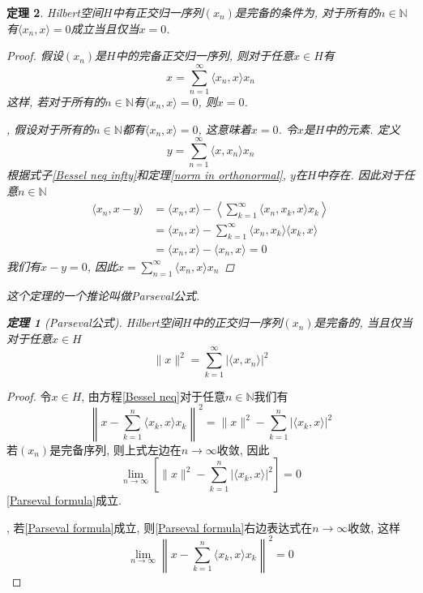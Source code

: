 \documentclass[a4paper,11pt]{article}
\newtheorem{theorem}{\hspace{2em}定理}[section]
\newtheorem{proof}{证明}[section]
\begin{document}
\begin{theorem}
  Hilbert空间$H$中有正交归一序列$(x_n)$是完备的条件为, 对于所有的$n\in\mathbb{N}$有$\langle x_n,x\rangle=0$成立当且仅当$x=0$.
  \begin{proof}
    假设$(x_n)$是$H$中的完备正交归一序列, 则对于任意$x\in H$有
    \begin{equation*}
      x=\sum_{n=1}^{\infty}\langle x_n,x\rangle x_n
    \end{equation*}
    这样, 若对于所有的$n\in \mathbb{N}$有$\langle x_n,x\rangle=0$, 则$x=0$.

    , 假设对于所有的$n\in \mathbb{N}$都有$\langle x_n,x\rangle=0$, 这意味着$x=0$. 令$x$是$H$中的元素. 定义
    \begin{equation*}
      y=\sum_{n=1}^{\infty}\langle x,x_n\rangle x_n
    \end{equation*}
    根据式子\eqref{Bessel neq infty}和定理\ref{norm in orthonormal}, $y$在$H$中存在. 因此对于任意$n\in \mathbb{N}$
    \begin{equation*}
      \begin{split}
         \langle x_n,x-y\rangle & =\langle x_n,x\rangle-\left\langle\sum_{k=1}^{\infty}\langle x_n,x_k,x\rangle x_k\right\rangle \\
           & =\langle x_n,x\rangle-\sum_{k=1}^{\infty}\langle x_n,x_k\rangle\langle x_k,x\rangle \\
           & =\langle x_n,x\rangle-\langle x_n,x\rangle=0
      \end{split}
    \end{equation*}
    我们有$x-y=0$, 因此$x=\sum_{n=1}^{\infty}\langle x_n,x\rangle x_n$
  \end{proof}
  这个定理的一个推论叫做Parseval公式.
  \begin{theorem}[Parseval公式]
    Hilbert空间$H$中的正交归一序列$(x_n)$是完备的, 当且仅当对于任意$x\in H$
    \begin{equation}\label{Parseval formula}
      \|x\|^2=\sum_{k=1}^{\infty}|\langle x,x_n\rangle|^2
    \end{equation}
  \end{theorem}
\end{theorem}
\begin{proof}
  令$x\in H$, 由方程\eqref{Bessel neq}对于任意$n\in\mathbb{N}$我们有
  \begin{equation*}
    \left\|x-\sum_{k=1}^{n}\langle x_k,x\rangle x_k\right\|^2=\|x\|^2-\sum_{k=1}^{n}|\langle x_k,x\rangle|^2
  \end{equation*}
  若$(x_n)$是完备序列, 则上式左边在$n\to \infty$收敛, 因此
  \begin{equation*}
    \lim_{n\to\infty}\left[\|x\|^2-\sum_{k=1}^{n}|\langle x_k,x\rangle|^2\right]=0
  \end{equation*}
  \eqref{Parseval formula}成立.

  , 若\eqref{Parseval formula}成立, 则\eqref{Parseval formula}右边表达式在$n\to\infty$收敛, 这样
  \begin{equation*}
    \lim_{n\to\infty}\left\|x-\sum_{k=1}^{n}\langle x_k,x\rangle x_k\right\|^2=0
  \end{equation*}
\end{proof}
\end{document}
